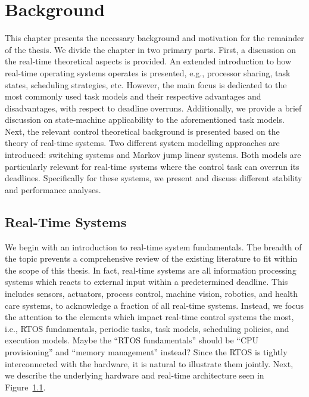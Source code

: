 \chapter{Background}%
\label{ch:background}%

This chapter presents the necessary background and motivation for the remainder of the thesis.
We divide the chapter in two primary parts.
First, a discussion on the real-time theoretical aspects is provided.
An extended introduction to how real-time operating systems operates is presented, e.g., processor sharing, task states, scheduling strategies, etc.
However, the main focus is dedicated to the most commonly used task models and their respective advantages and disadvantages, with respect to deadline overruns.
Additionally, we provide a brief discussion on state-machine applicability to the aforementioned task models. 
Next, the relevant control theoretical background is presented based on the theory of real-time systems.
Two different system modelling approaches are introduced: switching systems and Markov jump linear systems.
Both models are particularly relevant for real-time systems where the control task can overrun its deadlines.
Specifically for these systems, we present and discuss different stability and performance analyses.

\section{Real-Time Systems}%
\label{sec:background:rts}%
%
We begin with an introduction to real-time system fundamentals. 
The breadth of the topic prevents a comprehensive review of the existing literature to fit within the scope of this thesis.
In fact, real-time systems are all information processing systems which reacts to external input within a predetermined deadline. 
This includes sensors, actuators, process control, machine vision, robotics, and health care systems, to acknowledge a fraction of all real-time systems.
Instead, we focus the attention to the elements which impact real-time control systems the most, i.e., RTOS fundamentals, periodic tasks, task models, scheduling policies, and execution models.
\question%
{
    Maybe the ``RTOS fundamentals'' should be ``CPU provisioning'' and ``memory management'' instead?
}{}
Since the RTOS is tightly interconnected with the hardware, it is natural to illustrate them jointly.
Next, we describe the underlying hardware and real-time architecture seen in Figure~\ref{fig:operating-system-abstraction}.
%
\begin{figure}[t]
    \centering
    \caption{}%
    \label{fig:operating-system-abstraction}%
\end{figure}

